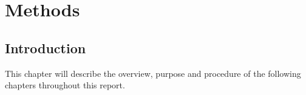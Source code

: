 \section{Methods}

\subsection{Introduction}
This chapter will describe the overview, purpose and procedure of the following chapters throughout this report.





